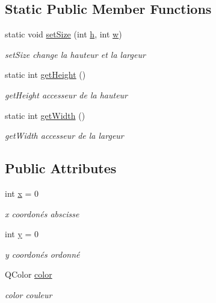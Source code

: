 \subsection*{Static Public Member Functions}
\begin{DoxyCompactItemize}
\item 
static void \hyperlink{class_unit_cell_a30d1461d8760fb72d87f683811df0d4e}{set\+Size} (int \hyperlink{class_unit_cell_ab90b8bcef203bb8a7341bf2b11aa48ac}{h}, int \hyperlink{class_unit_cell_a36cb2e967f43f4e71ded533752a92a1c}{w})
\begin{DoxyCompactList}\small\item\em set\+Size change la hauteur et la largeur \end{DoxyCompactList}\item 
static int \hyperlink{class_unit_cell_af42b23a4f6689ee4bfcdc43454ea2a4e}{get\+Height} ()
\begin{DoxyCompactList}\small\item\em get\+Height accesseur de la hauteur \end{DoxyCompactList}\item 
static int \hyperlink{class_unit_cell_a151f78bd5616f3e554c3e19077b96fb7}{get\+Width} ()
\begin{DoxyCompactList}\small\item\em get\+Width accesseur de la largeur \end{DoxyCompactList}\end{DoxyCompactItemize}
\subsection*{Public Attributes}
\begin{DoxyCompactItemize}
\item 
int \hyperlink{class_unit_cell_aae64c4e864e786746eba53443f946d69}{x} = 0\hypertarget{class_unit_cell_aae64c4e864e786746eba53443f946d69}{}\label{class_unit_cell_aae64c4e864e786746eba53443f946d69}

\begin{DoxyCompactList}\small\item\em x coordonés abscisse \end{DoxyCompactList}\item 
int \hyperlink{class_unit_cell_a9fdd4a78e21c23d47e535ed2510002ad}{y} = 0\hypertarget{class_unit_cell_a9fdd4a78e21c23d47e535ed2510002ad}{}\label{class_unit_cell_a9fdd4a78e21c23d47e535ed2510002ad}

\begin{DoxyCompactList}\small\item\em y coordonés ordonné \end{DoxyCompactList}\item 
Q\+Color \hyperlink{class_unit_cell_a6e7907cda650addf06f7f06c690180de}{color}\hypertarget{class_unit_cell_a6e7907cda650addf06f7f06c690180de}{}\label{class_unit_cell_a6e7907cda650addf06f7f06c690180de}

\begin{DoxyCompactList}\small\item\em color couleur \end{DoxyCompactList}\end{DoxyCompactItemize}
